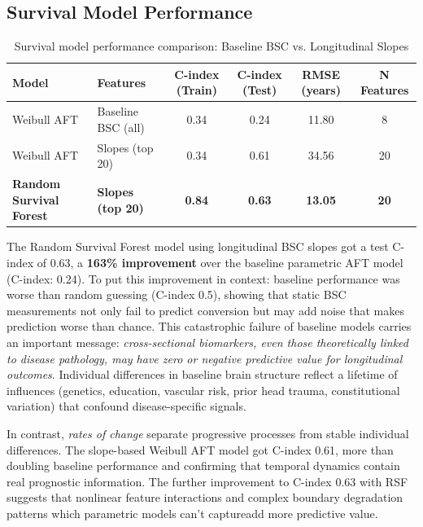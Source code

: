 \documentclass[blue]{ludusofficial}  %
\begin{document}
\subsection{Survival Model Performance}

\begin{table}[t!]
\centering
\caption{Survival model performance comparison: Baseline BSC vs. Longitudinal Slopes}
\label{tab:model-performance}
\begin{tabular}{llcccc}
\hline
\textbf{Model} & \textbf{Features} & \textbf{C-index (Train)} & \textbf{C-index (Test)} & \textbf{RMSE (years)} & \textbf{N Features} \\
\hline
Weibull AFT & Baseline BSC (all) & 0.34 & 0.24 & 11.80 & 8 \\
Weibull AFT & Slopes (top 20) & 0.34 & 0.61 & 34.56 & 20 \\
\hline
\textbf{Random Survival Forest} & \textbf{Slopes (top 20)} & \textbf{0.84} & \textbf{0.63} & \textbf{13.05} & \textbf{20} \\
\hline
\end{tabular}
\end{table}

The Random Survival Forest model using longitudinal BSC slopes got a test C-index of 0.63, a \textbf{163\% improvement} over the baseline parametric AFT model (C-index: 0.24). To put this improvement in context: baseline performance was worse than random guessing (C-index 0.5), showing that static BSC measurements not only fail to predict conversion but may add noise that makes prediction worse than chance. This catastrophic failure of baseline models carries an important message: \textit{cross-sectional biomarkers, even those theoretically linked to disease pathology, may have zero or negative predictive value for longitudinal outcomes}. Individual differences in baseline brain structure reflect a lifetime of influences (genetics, education, vascular risk, prior head trauma, constitutional variation) that confound disease-specific signals.

In contrast, \textit{rates of change} separate progressive processes from stable individual differences. The slope-based Weibull AFT model got C-index 0.61, more than doubling baseline performance and confirming that temporal dynamics contain real prognostic information. The further improvement to C-index 0.63 with RSF suggests that nonlinear feature interactions and complex boundary degradation patterns which parametric models can't captureadd more predictive value.
\end{document}
